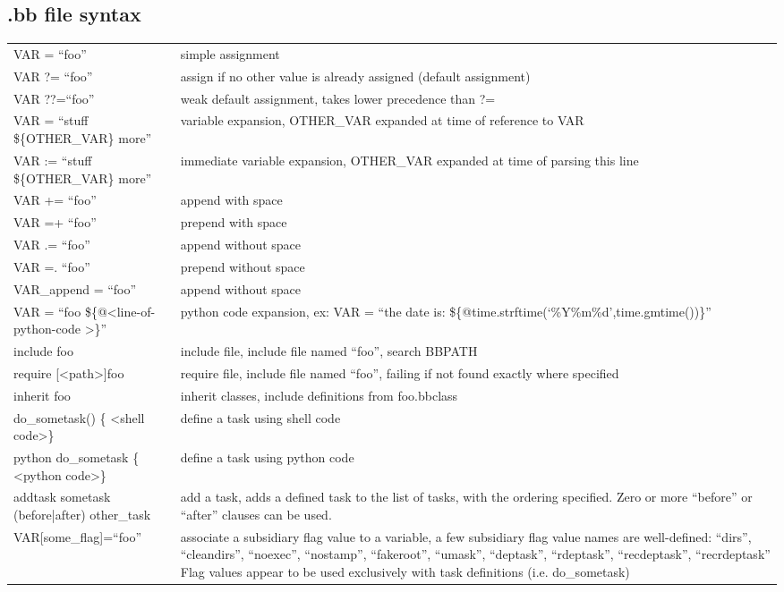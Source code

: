 \documentclass[10pt,a4paper,landscape]{article}
\begin{document}
\begin{multicols}{2}
\section{.bb file syntax}
\begin{tabular}{p{5.5cm}p{\linewidth - 6.4cm}}
VAR = ``foo'' & simple assignment \\
VAR ?= ``foo'' & assign if no other value is already assigned (default assignment) \\
VAR ??=``foo'' & weak default assignment, takes lower precedence than ?= \\
VAR = ``stuff \$\{OTHER\_VAR\} more'' &  variable expansion, OTHER\_VAR expanded at time of reference to VAR \\
VAR := ``stuff \$\{OTHER\_VAR\} more'' & immediate variable expansion, OTHER\_VAR expanded at time of parsing this line  \\
VAR += ``foo'' & append with space \\
VAR =+ ``foo'' & prepend with space \\
VAR .= ``foo'' & append without space \\
VAR =. ``foo'' & prepend without space \\
VAR\_append = ``foo'' & append without space \\
VAR = ``foo \$\{@\textless line-of-python-code \textgreater\}'' & python code expansion, ex: VAR = ``the date is: \$\{@time.strftime(`\%Y\%m\%d',time.gmtime())\}'' \\
include foo & include file, include file named ``foo'', search BBPATH \\
require [\textless path\textgreater]foo & require file, include file named ``foo'', failing if not found exactly where specified \\
inherit foo & inherit classes, include definitions from foo.bbclass \\
do\_sometask() \{   \textless shell code\textgreater  \}  & define a task using shell code \\
python do\_sometask \{ \textless python code\textgreater  \}  & define a task using python code \\
addtask sometask (before|after) other\_task & add a task, adds a defined task to the list of tasks, with the ordering specified. Zero or more ``before'' or ``after'' clauses can be used. \\
VAR[some\_flag]=``foo'' & associate a subsidiary flag value to a variable, a few subsidiary flag value names are well-defined: ``dirs'', ``cleandirs'', ``noexec'', ``nostamp'', ``fakeroot'', ``umask'', ``deptask'', ``rdeptask'', ``recdeptask'', ``recrdeptask''
Flag values appear to be used exclusively with task definitions (i.e. do\_sometask)
\end{tabular}



\end{multicols}
\end{document}
